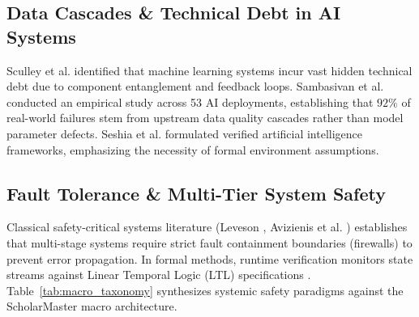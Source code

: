 \documentclass[conference]{IEEEtran}
\begin{document}
\subsection{Data Cascades \& Technical Debt in AI Systems}
Sculley et al. \cite{sculley2015hidden} identified that machine learning systems incur vast hidden technical debt due to component entanglement and feedback loops. Sambasivan et al. \cite{sambasivan2021everyone} conducted an empirical study across 53 AI deployments, establishing that $92\%$ of real-world failures stem from upstream data quality cascades rather than model parameter defects. Seshia et al. \cite{seshia2018toward} formulated verified artificial intelligence frameworks, emphasizing the necessity of formal environment assumptions.

\subsection{Fault Tolerance \& Multi-Tier System Safety}
Classical safety-critical systems literature (Leveson \cite{leveson1995safeware}, Avizienis et al. \cite{avizienis2004basic}) establishes that multi-stage systems require strict fault containment boundaries (firewalls) to prevent error propagation. In formal methods, runtime verification monitors state streams against Linear Temporal Logic (LTL) specifications \cite{pnueli1977temporal}. Table~\ref{tab:macro_taxonomy} synthesizes systemic safety paradigms against the ScholarMaster macro architecture.
\end{document}
